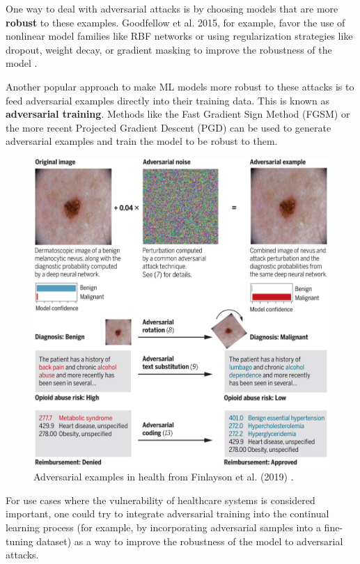\documentclass[../main.tex]{subfiles}
\begin{document}
    One way to deal with adversarial attacks is by choosing models that are more \textbf{robust} to these examples. Goodfellow et al. 2015, for example, favor the use of nonlinear model families like RBF networks or using regularization strategies like dropout, weight decay, or gradient masking to improve the robustness of the model \autocite{goodfellowExplainingHarnessingAdversarial2015}.
    
    \clearpage
    
    Another popular approach to make ML models more robust to these attacks is to feed adversarial examples directly into their training data. This is known as \textbf{adversarial training}. Methods like the Fast Gradient Sign Method \cite{goodfellowExplainingHarnessingAdversarial2015} (FGSM) or the more recent Projected Gradient Descent (PGD) \autocite{madryDeepLearningModels2019}  can be used to generate adversarial examples and train the model to be robust to them. 
    
    \begin{figure}
        \includegraphics[width=0.63\linewidth]{figures/medical-adversarial-attacks.jpeg}
        \caption{Adversarial examples in health from Finlayson et al. (2019) \cite{finlayson_adversarial_2019}.}
        \label{fig:medical_adversarial_attacks}
    \end{figure}
    
    For use cases where the vulnerability of healthcare systems is considered important, one could try to integrate adversarial training into the continual learning process (for example, by incorporating adversarial samples into a fine-tuning dataset) as a way to improve the robustness of the model to adversarial attacks. 
\end{document}
